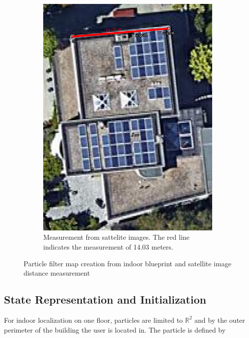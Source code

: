 \begin{figure}[H]
\begin{subfigure}[t]{.4\textwidth}
		\includegraphics[width=0.9\linewidth]{images/house_google_maps}
		\caption{ Measurement from sattelite images. The red line indicates the measurement of 14.03 meters.}
		\label{fig:house_google_maps}
	\end{subfigure} \quad
	\label{fig:particle_map_construction}
	\caption{Particle filter map creation from indoor blueprint and satellite image distance measurement}
\end{figure}

\subsection{State Representation and Initialization}
For indoor localization on one floor, particles are limited to $\mathbb{R}^{2}$ and by the outer perimeter of the building the user is located in. The particle is defined by 


